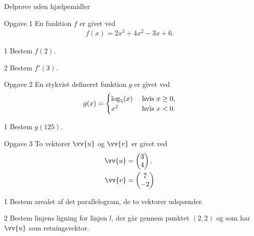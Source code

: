 \begin{center}
\LARGE
Delprøve uden hjælpemidler 
\end{center}

%
%
%
%
\begin{opgavetekst}{Opgave 1}
	En funktion $f$ er givet ved
	\begin{align*}
		f(x) = 2x^3+4x^2-3x+6.
	\end{align*}
\end{opgavetekst}
\begin{delopgave}{}{1}
	Bestem $f(2)$.
\end{delopgave}
\begin{delopgave}{}{2}
	Bestem $f'(3)$.
\end{delopgave}
%
%
%
%
\begin{opgavetekst}{Opgave 2}
	En stykvist defineret funktion $g$ er givet ved
	\begin{align*}
		g(x) = \begin{cases}
			\log_5(x) \ &\textnormal{hvis }x \geq 0, \\
			x^2 \ &\textnormal{hvis }x < 0.		
		\end{cases}
	\end{align*}
\end{opgavetekst}
\begin{delopgave}{}{1}
	Bestem $g(125)$.
\end{delopgave}
%
%
%
%
\begin{opgavetekst}{Opgave 3}
	To vektorer $\vv{u}$ og $\vv{v}$ er givet ved
	\begin{align*}
		\vv{u} &= 
		\begin{pmatrix}
			3 \\ 4
		\end{pmatrix}, \\
		\vv{v} &= 
		\begin{pmatrix}
			7 \\ -2
		\end{pmatrix}
	\end{align*}
\end{opgavetekst}
\begin{delopgave}{}{1}
	Bestem arealet af det parallelogram, de to vektorer udspænder. 
\end{delopgave}
\begin{delopgave}{}{2}
	Bestem linjens ligning for linjen $l$, der går gennem punktet $(2,2)$ og som har $\vv{u}$ som 
	retningsvektor.
\end{delopgave}

